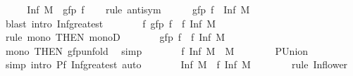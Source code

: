 \begin{isabellebody}
\ \ \isamarkupfalse%
\ \isamarkupfalse%
\ {\isachardoublequoteopen}Inf\ {\isacharquery}{\kern0pt}M\ {\isacharequal}{\kern0pt}\ gfp\ f{\isachardoublequoteclose}\isanewline
\ \ \isamarkupfalse%
\ {\isacharparenleft}{\kern0pt}rule\ antisym{\isacharparenright}{\kern0pt}\isanewline
\ \ \ \ \isamarkupfalse%
\ {\isachardoublequoteopen}gfp\ f\ {\isasymle}\ Inf\ {\isacharquery}{\kern0pt}M{\isachardoublequoteclose}\isanewline
\ \ \ \ \ \ \isamarkupfalse%
\ {\isacharparenleft}{\kern0pt}blast\ intro{\isacharcolon}{\kern0pt}\ Inf{\isacharunderscore}{\kern0pt}greatest{\isacharparenright}{\kern0pt}\isanewline
\ \ \ \ \isamarkupfalse%
\ \isamarkupfalse%
\ {\isachardoublequoteopen}f\ {\isacharparenleft}{\kern0pt}gfp\ f{\isacharparenright}{\kern0pt}\ {\isasymle}\ f\ {\isacharparenleft}{\kern0pt}Inf\ {\isacharquery}{\kern0pt}M{\isacharparenright}{\kern0pt}{\isachardoublequoteclose}\isanewline
\ \ \ \ \ \ \isamarkupfalse%
\ {\isacharparenleft}{\kern0pt}rule\ mono\ {\isacharbrackleft}{\kern0pt}THEN\ monoD{\isacharbrackright}{\kern0pt}{\isacharparenright}{\kern0pt}\isanewline
\ \ \ \ \isamarkupfalse%
\ \isamarkupfalse%
\ {\isachardoublequoteopen}gfp\ f\ {\isasymle}\ f\ {\isacharparenleft}{\kern0pt}Inf\ {\isacharquery}{\kern0pt}M{\isacharparenright}{\kern0pt}{\isachardoublequoteclose}\isanewline
\ \ \ \ \ \ \isamarkupfalse%
\ mono\ {\isacharbrackleft}{\kern0pt}THEN\ gfp{\isacharunderscore}{\kern0pt}unfold{\isacharbrackright}{\kern0pt}\ \isamarkupfalse%
\ simp\isanewline
\ \ \ \ \isamarkupfalse%
\ \isamarkupfalse%
\ {\isachardoublequoteopen}f\ {\isacharparenleft}{\kern0pt}Inf\ {\isacharquery}{\kern0pt}M{\isacharparenright}{\kern0pt}\ {\isasymin}\ {\isacharquery}{\kern0pt}M{\isachardoublequoteclose}\isanewline
\ \ \ \ \ \ \isamarkupfalse%
\ P{\isacharunderscore}{\kern0pt}Union\ \isamarkupfalse%
\ simp\ {\isacharparenleft}{\kern0pt}intro\ P{\isacharunderscore}{\kern0pt}f\ Inf{\isacharunderscore}{\kern0pt}greatest{\isacharcomma}{\kern0pt}\ auto{\isacharparenright}{\kern0pt}\isanewline
\ \ \ \ \isamarkupfalse%
\ \isamarkupfalse%
\ {\isachardoublequoteopen}Inf\ {\isacharquery}{\kern0pt}M\ {\isasymle}\ f\ {\isacharparenleft}{\kern0pt}Inf\ {\isacharquery}{\kern0pt}M{\isacharparenright}{\kern0pt}{\isachardoublequoteclose}\isanewline
\ \ \ \ \ \ \isamarkupfalse%
\ {\isacharparenleft}{\kern0pt}rule\ Inf{\isacharunderscore}{\kern0pt}lower{\isacharparenright}{\kern0pt}\isanewline

\end{isabellebody}
